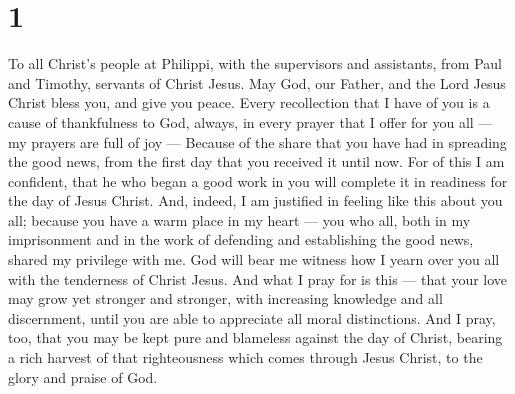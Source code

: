 \hypertarget{section}{%
\section{1}\label{section}}

 To all Christ's people at Philippi, with the supervisors
and assistants, from Paul and Timothy, servants of Christ Jesus.
 May God, our Father, and the Lord Jesus Christ bless you,
and give you peace.  Every recollection that I have of you
is a cause of thankfulness to God,  always, in every prayer
that I offer for you all --- my prayers are full of joy --- 
Because of the share that you have had in spreading the good news, from
the first day that you received it until now.  For of this I
am confident, that he who began a good work in you will complete it in
readiness for the day of Jesus Christ.  And, indeed, I am
justified in feeling like this about you all; because you have a warm
place in my heart --- you who all, both in my imprisonment and in the
work of defending and establishing the good news, shared my privilege
with me.  God will bear me witness how I yearn over you all
with the tenderness of Christ Jesus.  And what I pray for is
this --- that your love may grow yet stronger and stronger, with
increasing knowledge and all discernment,  until you are
able to appreciate all moral distinctions. And I pray, too, that you may
be kept pure and blameless against the day of Christ, 
bearing a rich harvest of that righteousness which comes through Jesus
Christ, to the glory and praise of God.

